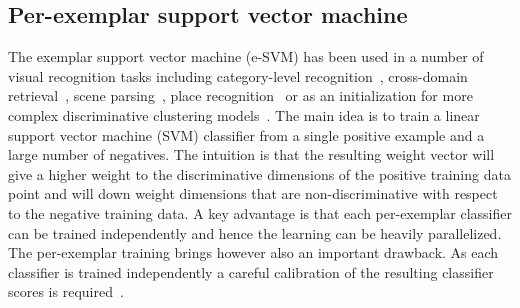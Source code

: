 \documentclass[table]{article} %
\begin{document}


\vspace{-3mm}
\subsection*{Per-exemplar support vector machine} \vspace{-3mm}
    The exemplar support vector machine (e-SVM) has been used in a number of visual recognition tasks including
    category-level recognition~\cite{Malisiewicz11}, cross-domain retrieval~\cite{Shrivastava11}, scene parsing~\cite{Tighe13}, %
    place recognition~\cite{Gronat13} or as an initialization  for more complex discriminative clustering models~\cite{Doersch12,Singh12}. The main idea is to train a linear support vector machine (SVM) classifier from a single positive example and a large number of negatives. The intuition is that the resulting weight vector will give a higher weight to the discriminative dimensions of the positive training data point and will down weight dimensions that are non-discriminative with respect to the negative training data. A key advantage is that each per-exemplar classifier can be trained independently and hence the learning can be heavily parallelized. 
    The per-exemplar training brings however also an important drawback. As each classifier is trained independently a
    careful calibration of the resulting classifier scores is required~\cite{Gronat13,Malisiewicz11}. 

%
\end{document}
